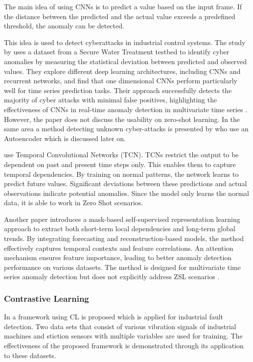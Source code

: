 The main idea of using CNNs is to predict a value based on the input frame. If the distance between the predicted and the actual value exceeds a predefined threshold, the anomaly can be detected.

This idea is used to detect cyberattacks in industrial control systems. The study by \cite{kravchik_detecting_2018} uses a dataset from a Secure Water Treatment testbed to identify cyber anomalies by measuring the statistical deviation between predicted and observed values. They explore different deep learning architectures, including CNNs and recurrent networks, and find that one dimensional CNNs perform particularly well for time series prediction tasks. Their approach successfully detects the majority of cyber attacks with minimal false positives, highlighting the effectiveness of CNNs in real-time anomaly detection in multivariate time series \cite{kravchik_detecting_2018}. However, the paper does not discuss the usability on zero-shot learning. In the same area a method detecting unknown cyber-attacks is presented by \cite{zhang_unknown_2020} who use an Autoencoder which is discussed later on.

\cite{he_temporal_2019} use Temporal Convolutional Networks (TCN). TCNs restrict the output to be dependent on past and present time steps only. This enables them to capture temporal dependencies. By training on normal patterns, the network learns to predict future values. Significant deviations between these predictions and actual observations indicate potential anomalies. Since the model only learns the normal data, it is able to work in Zero Shot scenarios.

Another paper introduces a mask-based self-supervised representation learning approach to extract both short-term local dependencies and long-term global trends. By integrating forecasting and reconstruction-based models, the method effectively captures temporal contexts and feature correlations. An attention mechanism ensures feature importance, leading to better anomaly detection performance on various datasets. The method is designed for multivariate time series anomaly detection but does not explicitly address ZSL scenarios \cite{miao_unsupervised_2022}.

\subsubsection{Contrastive Learning}
In \cite{zhang_debiased_2024} a framework using CL is proposed which is applied for industrial fault detection. Two data sets that consist of various vibration signals of industrial machines and stiction sensors with multiple variables are used for training. The effectiveness of the proposed framework is demonstrated through its application to these datasets.

